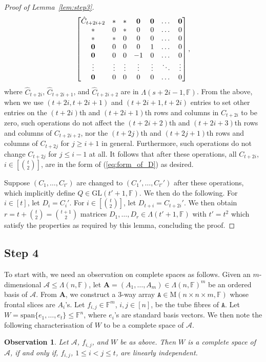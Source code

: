 \documentclass[10pt]{article}
\newtheorem{observation}[theorem]{Observation}
\newcommand{\tuple}[1]{\mathbf{#1}}
\newcommand{\tens}[1]{\mathtt{#1}}
\newcommand{\spa}[1]{\mathcal{#1}}
\newcommand{\GL}{\mathrm{GL}}
\newcommand{\F}{\mathbb{F}}
\newcommand{\M}{\mathrm{M}}
\renewcommand{\span}{\mathrm{span}}
\newcommand{\cA}{\spa{A}}
\newcommand{\tA}{\tens{A}}
\newcommand{\vzero}{\tuple{0}}
\newcommand{\vstar}{{\bf *}}
\newcommand{\bA}{\mathbf{A}}
\begin{document}
\begin{proof}[Proof of Lemma~\ref{lem:step3}]
$${\begin{bmatrix}
\hat C_{t+2i+2} & \vstar & \vstar & \vzero & \vzero & \dots & \vzero \\
\vstar & 0 & * & 0 & 0 & \dots & 0 \\
\vstar & * & 0 & 0 & 0 &\dots & 0 \\
\vzero & 0 & 0 & 0 & 1 &\dots & 0 \\
\vzero & 0 & 0 & -1 & 0 &\dots & 0 \\
\vdots & \vdots & \vdots & \vdots & \vdots &\ddots & \vdots \\
\vzero & 0 & 0 & 0 & 0 &\dots & 0 
\end{bmatrix},}
$$
where $\hat C_{t+2i}$, $\hat C_{t+2i+1}$, and $\hat C_{t+2i+2}$ are in 
$\Lambda(s+2i-1, \F)$.
From the above, when we use $(t+2i, t+2i+1)$ and $(t+2i+1, t+2i)$ entries  
to set other entries on the $(t+2i)$th and $(t+2i+1)$th rows and columns in 
$C_{t+2i}$ to be zero, such operations
do not affect the $(t+2i+2)$th and $(t+2i+3)$th rows and columns of 
$C_{t+2i+2}$, nor the $(t+2j)$th and $(t+2j+1)$th rows and columns of $C_{t+2j}$ 
for $j\geq i+1$ in general. Furthermore, such operations do not change $C_{t+2j}$ 
for $j\leq i-1$ at all. It follows that after these operations, all $C_{t+2i}$, 
$i\in[\binom{t}{2}]$, are in the form of (\ref{eq:form_of_D}) as desired.

%
%
%
%
%
%
%

Suppose $(C_1, \dots, C_{t'})$ are changed to $(C_1', 
\dots, 
C_{t'}')$ after these operations, which implicitly define $Q\in\GL(t'+1, \F)$. We 
then do the following. For $i\in[t]$, let $D_i=C_i'$. For 
$i\in[\binom{t}{2}]$, let $D_{t+i}=C_{t+2i}'$. We then obtain 
$r=t+\binom{t}{2}=\binom{t+1}{2}$ matrices 
$D_1, \dots, D_r\in\Lambda(t'+1, \F)$ with $t'=t^2$ which satisfy the properties 
as required by this lemma, concluding the proof.
\end{proof}

%
%
%
%
%
%
%
%
%
%
%
%

\subsection{Step 4} To start with, we need an observation on complete 
spaces as follows. 
%
%
Given an $m$-dimensional $\cA\leq\Lambda(n, \F)$, let
$\bA=(A_1, 
\dots, A_m)\in \Lambda(n, \F)^m$ be an ordered basis of $\cA$. 
From $\bA$, we construct a $3$-way 
array $\tA\in\M(n\times n\times m, \F)$ whose frontal slices are $A_i$'s. Let 
$f_{i,j}\in \F^m$, $i, j\in[n]$, be the tube fibres of $\tA$. Let
$W=\span\{ e_1, \dots, e_t\}\leq \F^n$, where $e_i$'s are standard basis 
vectors. We then note the following characterisation of $W$ to be a complete space 
of $\cA$.
\begin{observation}\label{obs:tube}
Let $\cA$, $f_{i,j}$, and $W$ be as above. Then $W$ is a complete space of 
$\cA$, 
if and only 
if, $f_{i,j}$, 
$1\leq i<j\leq t$, are linearly independent. 
\end{observation}
\end{document}
